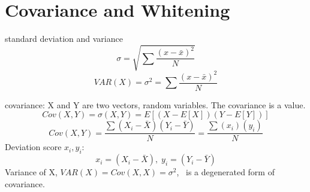 \section{Covariance and Whitening}
\begin{compactitem}

\item {standard deviation and variance}
\begin{equation}
\label{eq:std}
\sigma = \sqrt {\sum \frac{(x-\bar{x})^2}{N}}
\end{equation}
\begin{equation}
\label{eq:variance}
VAR(X)=\sigma^{2} = {\sum \frac{(x-\bar{x})^2}{N}}
\end{equation}

\item covariance: X and Y are two vectors, random variables. The covariance is a value.
\begin{equation}
\label{eq:covar}
Cov(X,Y)=\sigma(X,Y)=E[(X - E[X])(Y-E[Y])]
\end{equation}
\begin{equation}
\label{eq:covar1}
Cov(X,Y)=\frac{\sum(X_i-\bar{X})(Y_i-\bar{Y})}{N}=
\frac{\sum(x_i)(y_i)}{N}
\end{equation}
Deviation score $x_i, y_i$:
\begin{equation}
\label{eq:covar1}
x_{i}=(X_i-\bar{X}),\;
y_{i}=(Y_i-\bar{Y})
\end{equation}
Variance of X, $VAR(X)=Cov(X,X)=\sigma^{2}$, \ is a degenerated form of covariance.\\


\end{compactitem}
